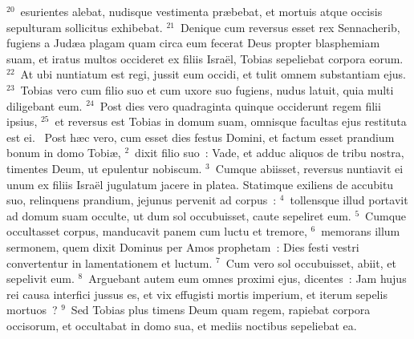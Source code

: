${}^{20}$~esurientes alebat, nudisque vestimenta pr\ae bebat, et mortuis atque occisis sepulturam sollicitus exhibebat.
${}^{21}$~Denique cum reversus esset rex Sennacherib, fugiens a Jud\ae a plagam quam circa eum fecerat Deus propter blasphemiam suam, et iratus multos occideret ex filiis Isra\"el, Tobias sepeliebat corpora eorum.
${}^{22}$~At ubi nuntiatum est regi, jussit eum occidi, et tulit omnem substantiam ejus.
${}^{23}$~Tobias vero cum filio suo et cum uxore suo fugiens, nudus latuit, quia multi diligebant eum.
${}^{24}$~Post dies vero quadraginta quinque occiderunt regem filii ipsius,
${}^{25}$~et reversus est Tobias in domum suam, omnisque facultas ejus restituta est ei.
~\lettrine[lines=10,image=true,loversize=0.05,lraise=-0.03]{P}{}ost h\ae c vero, cum esset dies festus Domini, et factum esset prandium bonum in domo Tobi\ae ,
${}^{2}$~dixit filio suo~: Vade, et adduc aliquos de tribu nostra, timentes Deum, ut epulentur nobiscum.
${}^{3}$~Cumque abiisset, reversus nuntiavit ei unum ex filiis Isra\"el jugulatum jacere in platea. Statimque exiliens de accubitu suo, relinquens prandium, jejunus pervenit ad corpus~:
${}^{4}$~tollensque illud portavit ad domum suam occulte, ut dum sol occubuisset, caute sepeliret eum.
${}^{5}$~Cumque occultasset corpus, manducavit panem cum luctu et tremore,
${}^{6}$~memorans illum sermonem, quem dixit Dominus per Amos prophetam~: Dies festi vestri convertentur in lamentationem et luctum.
${}^{7}$~Cum vero sol occubuisset, abiit, et sepelivit eum.
${}^{8}$~Arguebant autem eum omnes proximi ejus, dicentes~: Jam hujus rei causa interfici jussus es, et vix effugisti mortis imperium, et iterum sepelis mortuos~?
${}^{9}$~Sed Tobias plus timens Deum quam regem, rapiebat corpora occisorum, et occultabat in domo sua, et mediis noctibus sepeliebat ea.



